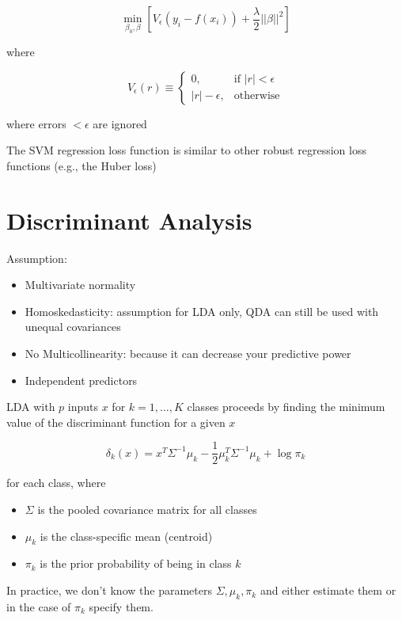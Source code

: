 \documentclass[
]{book}
\begin{document}
\[
\underset{\beta_0, \beta}{\operatorname{min}} [ V_\epsilon (y_i - f(x_i)) + \frac{\lambda}{2}||\beta||^2]
\]

where

\[
V_\epsilon(r) \equiv
\begin{cases}
0, & \text{if } |r| < \epsilon \\
|r|- \epsilon, & \text{otherwise}
\end{cases}
\]

where errors \(< \epsilon\) are ignored \citep[12.3.6]{hastie2001a}

The SVM regression loss function is similar to other robust regression loss functions (e.g., the Huber loss)

\hypertarget{discriminant-analysis}{%
\chapter{Discriminant Analysis}\label{discriminant-analysis}}

Assumption:

\begin{itemize}
\item
  Multivariate normality
\item
  Homoskedasticity: assumption for LDA only, QDA can still be used with unequal covariances
\item
  No Multicollinearity: because it can decrease your predictive power
\item
  Independent predictors
\end{itemize}

LDA with \(p\) inputs \(x\) for \(k = 1, \dots ,K\) classes proceeds by finding the minimum value of the discriminant function for a given \(x\)

\[
\delta_k(x) = x^T \Sigma^{-1} \mu_k - \frac{1}{2} \mu_k^T \Sigma^{-1} \mu_k + \log \pi_k
\]

for each class, where

\begin{itemize}
\item
  \(\Sigma\) is the pooled covariance matrix for all classes
\item
  \(\mu_k\) is the class-specific mean (centroid)
\item
  \(\pi_k\) is the prior probability of being in class \(k\)
\end{itemize}

In practice, we don't know the parameters \(\Sigma,\mu_k, \pi_k\) and either estimate them or in the case of \(\pi_k\) specify them.
\end{document}
